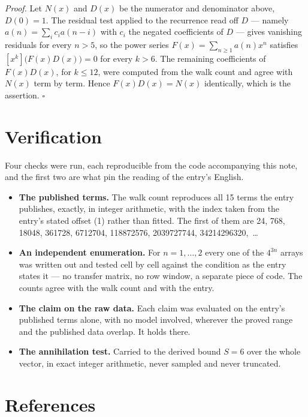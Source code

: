 \documentclass[11pt]{article}
\theoremstyle{definition}
\begin{document}
{\itshape Proof.} Let $N(x)$ and $D(x)$ be the numerator and denominator above, $D(0)=1$. The residual test applied to the recurrence read off $D$ --- namely $a(n) = \sum_i c_i a(n-i)$ with $c_i$ the negated coefficients of $D$ --- gives vanishing residuals for every $n > 5$, so the power series $F(x)=\sum_{n\ge 1}a(n)x^n$ satisfies $[x^k]\bigl(F(x)D(x)\bigr) = 0$ for every $k > 6$. The remaining coefficients of $F(x)D(x)$, for $k \le 12$, were computed from the walk count and agree with $N(x)$ term by term. Hence $F(x)D(x) = N(x)$ identically, which is the assertion. $\square$

\section{Verification}

Four checks were run, each reproducible from the code accompanying this note, and the first two are what pin the reading of the entry's English.

\begin{itemize}

\item {\bfseries The published terms.} The walk count reproduces all 15 terms the entry publishes, exactly, in integer arithmetic, with the index taken from the entry's stated offset (1) rather than fitted. The first of them are 24, 768, 18048, 361728, 6712704, 118872576, 2039727744, 34214296320,~\dots

\item {\bfseries An independent enumeration.} For $n = 1,\dots,2$ every one of the $4^{3n}$ arrays was written out and tested cell by cell against the condition as the entry states it --- no transfer matrix, no row window, a separate piece of code. The counts agree with the walk count and with the entry.

\item {\bfseries The claim on the raw data.} Each claim was evaluated on the entry's published terms alone, with no model involved, wherever the proved range and the published data overlap. It holds there.

\item {\bfseries The annihilation test.} Carried to the derived bound $S = 6$ over the whole vector, in exact integer arithmetic, never sampled and never truncated.

\end{itemize}

\section{References}
\end{document}
